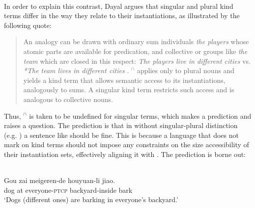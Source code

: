 \documentclass[output=paper,
modfonts
]{langscibook}
\begin{document}
	\ea \label{ex:despic:38}
	 \\
	\z 
	\z 
	
	In order to explain this contrast, Dayal argues that singular and plural kind terms differ in the way they relate to their instantiations, as illustrated by the following quote:
	
	\begin{quotation} 
		An analogy can be drawn with ordinary sum individuals \textit{the players} whose atomic parts are available for predication, and collective  or groups like \textit{the team} which are closed in this respect: \textit{The players live in different cities} vs. \textit{*The team lives in different cities} \citep{Barker1992, Schwarzschild1996}. $^\cap$ applies only to plural nouns and yields a kind term that allows semantic access to its instantiations, analogously to sums. A singular kind term restricts such access and is analogous to collective nouns. \citep[1100]{Dayal2011}
	\end{quotation} 
	
	Thus, $^\cap$ is taken to be undefined for singular terms, which makes a prediction and raises a question. The prediction is that in  without singular-plural distinction (e.g. ) a sentence like  should be fine. This is because a language that does not mark  on kind terms should not impose any constraints on the size accessibility of their instantiation sets, effectively aligning it with . The prediction is borne out:
	
	\ea \label{ex:despic:39}
	 \\
	\gll
	{Gou} {zai} {meigeren-de} {houyuan-li} {jiao.} \\
	dog at everyone-\textsc{ptcp} backyard-inside bark \\
	\glt `Dogs (different ones) are barking in everyone's backyard.' \citep[413]{Dayal2004}
	\z 
	
\end{document}
